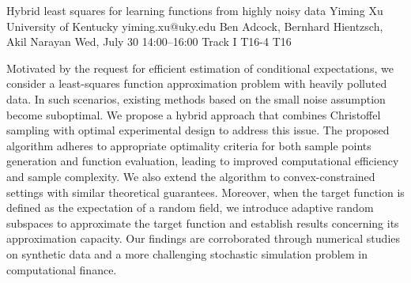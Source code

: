 \begin{talk}
  {Hybrid least squares for learning functions from highly noisy data}%
  {Yiming Xu}%
  {University of Kentucky}%
  {yiming.xu@uky.edu}%
  {Ben Adcock, Bernhard Hientzsch, Akil Narayan}%
  {}%
  {Wed, July 30 14:00–16:00 Track I}%
  {T16-4}%
  {T16}%
  
				
			
Motivated by the request for efficient estimation of conditional expectations, we consider a least-squares function approximation problem with heavily polluted data. In such scenarios, existing methods based on the small noise assumption become suboptimal. We propose a hybrid approach that combines Christoffel sampling with optimal experimental design to address this issue. The proposed algorithm adheres to appropriate optimality criteria for both sample points generation and function evaluation, leading to improved computational efficiency and sample complexity. We also extend the algorithm to convex-constrained settings with similar theoretical guarantees. Moreover, when the target function is defined as the expectation of a random field, we introduce adaptive random subspaces to approximate the target function and establish results concerning its approximation capacity. Our findings are corroborated through numerical studies on synthetic data and a more challenging stochastic simulation problem in computational finance.
\medskip

\end{talk}
